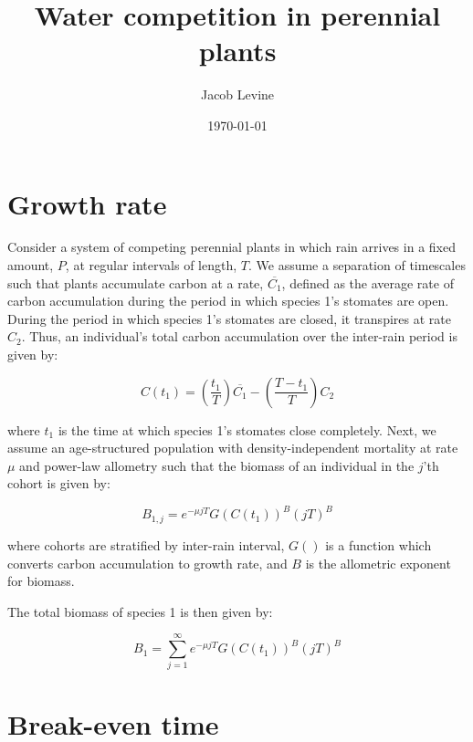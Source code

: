 \documentclass[11pt]{article}
\author{Jacob Levine}
\date{\today}
\title{Water competition in perennial plants}
\begin{document}
\maketitle
\tableofcontents



\section{Growth rate}
\label{sec:org3914024}

Consider a system of competing perennial plants in which rain arrives in a fixed amount, \(P\), at regular intervals of length, \(T\). We assume a separation of timescales such that plants accumulate carbon at a rate, \(\overline{C_1}\), defined as the average rate of carbon accumulation during the period in which species 1's stomates are open. During the period in which species 1's stomates are closed, it transpires at rate \(C_2\). Thus, an individual's total carbon accumulation over the inter-rain period is given by:

\begin{equation}
  C(t_1) = \left(\frac{t_1}{T}\right)\overline{C_1} - \left(\frac{T-t_1}{T}\right)C_2
\end{equation}

where \(t_1\) is the time at which species 1's stomates close completely. Next, we assume an age-structured population with density-independent mortality at rate \(\mu\) and power-law allometry such that the biomass of an individual in the \(j\)'th cohort is given by:

\begin{equation}
  B_{1,j} =  e^{-\mu j T} G(C(t_1))^B (j T)^B
\end{equation}

where cohorts are stratified by inter-rain interval, \(G()\) is a function which converts carbon accumulation to growth rate, and \(B\) is the allometric exponent for biomass.

The total biomass of species 1 is then given by:

\begin{equation}
B_{1} = \sum_{j=1}^{\infty} e^{-\mu j T} G(C(t_1))^B (j T)^B
\end{equation}

\section{Break-even time}
\label{sec:orgf22f073}
\end{document}
